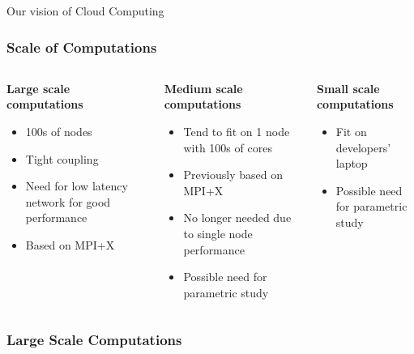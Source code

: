 \documentclass[10pt,aspectratio=1609]{beamer}
\begin{document}
\begin{section}{Our vision of Cloud Computing}
\begin{frame}
  \frametitle{Scale of Computations}

  \begin{columns}[T] %
    \begin{column}{0.33\textwidth}
      \textbf{Large scale computations}
      \begin{itemize}
        \item 100s of nodes
        \item Tight coupling
        \item Need for low latency network for good performance
        \item Based on MPI+X
      \end{itemize}
    \end{column}
    \begin{column}{0.33\textwidth}
      \textbf{Medium scale computations}
      \begin{itemize}
        \item Tend to fit on 1 node with 100s of cores
        \item Previously based on MPI+X
        \item No longer needed due to single node performance
        \item Possible need for parametric study
      \end{itemize}
    \end{column}
    \begin{column}{0.33\textwidth}
      \textbf{Small scale computations}
      \begin{itemize}
        \item Fit on developers' laptop
        \item Possible need for parametric study
      \end{itemize}
    \end{column}
  \end{columns}

\end{frame}

\begin{frame}
  \frametitle{Large Scale Computations}


\end{frame}
\end{section}
\end{document}
